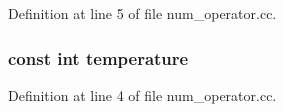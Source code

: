 Definition at line 5 of file num\+\_\+operator.\+cc.

\hypertarget{num__operator_8hh_a9bb68aa6c4819d6d9361d10f2d5829ae}{
\subsubsection[{temperature}]{\setlength{\rightskip}{0pt plus 5cm}const int temperature}}\label{num__operator_8hh_a9bb68aa6c4819d6d9361d10f2d5829ae}


Definition at line 4 of file num\+\_\+operator.\+cc.

